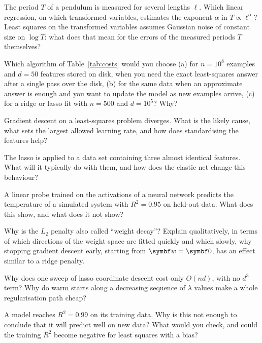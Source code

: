 \documentclass[11pt]{article}
\newcommand{\w}{\vect{w}}
\begin{document}
\begin{questions}
\begin{conceptual}
\item The period $T$ of a pendulum is measured for several lengths $\ell$. Which linear regression, on which transformed
variables, estimates the exponent $\alpha$ in $T \propto \ell^{\alpha}$? Least squares on the transformed variables
assumes Gaussian noise of constant size on $\log T$: what does that mean for the errors of the measured periods $T$
themselves?
\item Which algorithm of Table~\ref{tab:costs} would you choose (a) for $n = 10^8$ examples and $d = 50$ features
stored on disk, when you need the exact least-squares answer after a single pass over the disk, (b) for the same data
when an approximate answer is enough and you want to update the model as new examples arrive, (c) for a ridge or lasso
fit with $n = 500$ and $d = 10^5$? Why?
\item Gradient descent on a least-squares problem diverges. What is the likely cause, what sets the largest allowed
learning rate, and how does standardising the features help?
\item The lasso is applied to a data set containing three almost identical features. What will it typically do with
them, and how does the elastic net change this behaviour?
\item A linear probe trained on the activations of a neural network predicts the temperature of a simulated system with
$R^2 = 0.95$ on held-out data. What does this show, and what does it not show?
\item Why is the $L_2$ penalty also called ``weight decay''? Explain qualitatively, in terms of which directions of
the weight space are fitted quickly and which slowly, why stopping gradient descent early, starting from
$\w = \vect{0}$, has an effect similar to a ridge penalty.
\item Why does one sweep of lasso coordinate descent cost only $O(nd)$, with no $d^3$ term? Why do warm starts along a
decreasing sequence of $\lambda$ values make a whole regularisation path cheap?
\item A model reaches $R^2 = 0.99$ on its training data. Why is this not enough to conclude that it will predict well on
new data? What would you check, and could the training $R^2$ become negative for least squares with a bias?
\end{conceptual}


\end{questions}
\end{document}
